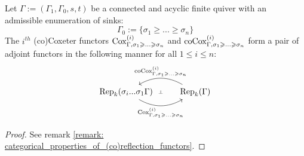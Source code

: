             \begin{lemma} \label{lemma: coxeter_functors_are_adjoints}
                Let $\Gamma := (\Gamma_1, \Gamma_0, s, t)$ be a connected and acyclic finite quiver with an admissible enumeration of sinks:
                    $$\Gamma_0 := \{\sigma_1 \geq ... \geq \sigma_n\}$$
                The $i^{th}$ (co)Coxeter functors $\mathrm{Cox}^{(i)}_{\Gamma, \sigma_1 \geqslant ...\geqslant \sigma_n}$ and $\mathrm{co}\mathrm{Cox}^{(i)}_{\Gamma, \sigma_1 \geqslant ...\geqslant \sigma_n}$ form a pair of adjoint functors in the following manner for all $1 \leq i \leq n$:
                    $$
                        \begin{tikzcd}
                        	{\Rep_k(\sigma_i ... \sigma_1\Gamma)} & {\Rep_k(\Gamma)}
                        	\arrow[""{name=0, anchor=center, inner sep=0}, "{\Cox^{(i)}_{\Gamma, \sigma_1 \geq ...\geq \sigma_n}}"', bend right, from=1-1, to=1-2]
                        	\arrow[""{name=1, anchor=center, inner sep=0}, "{\co\Cox^{(i)}_{\Gamma, \sigma_1 \geq ...\geq \sigma_n}}"', bend right, from=1-2, to=1-1]
                        	\arrow["\dashv"{anchor=center, rotate=-90}, draw=none, from=1, to=0]
                        \end{tikzcd}
                    $$
            \end{lemma}
                \begin{proof}
                    See remark \ref{remark: categorical_properties_of_(co)reflection_functors}.
                \end{proof}
            
